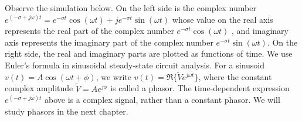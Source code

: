 \documentclass{ximera}
\begin{document}
Observe the simulation below. On the left side is the complex number $e^{(-\sigma+j\omega)t} = e^{-\sigma t} \cos(\omega t) + j e^{-\sigma t} \sin (\omega t)$ whose value on the real axis represents the real part of the complex number $e^{-\sigma t} \cos(\omega t)$ , and imaginary axis represents the imaginary part of the complex number $e^{-\sigma t} \sin (\omega t)$. On the right side, the real and imaginary parts are plotted
as functions of time.
We use Euler's formula in sinusoidal steady-state circuit analysis.
For a sinusoid $v(t)=A\cos(\omega t+\phi)$, we write
$v(t)=\Re\{\tilde{V}e^{j\omega t}\}$, where the constant
complex amplitude $\tilde{V}=Ae^{j\phi}$ is called a phasor.
The time-dependent expression $e^{(-\sigma+j\omega)t}$
above is a complex signal, rather than a constant phasor.
We will study phasors in the next chapter.

  
 \begin{center}  
\end{center} 
\end{document}
